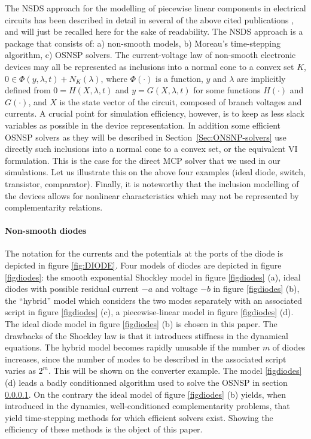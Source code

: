 The NSDS approach for the  modelling of piecewise linear components in electrical circuits has been described in detail  in several of the above cited publications \cite{acary-brogliato2008,glocker2005,moreau1988,jean1999,moreau1999}, and will just be recalled here for the sake of readability. The NSDS approach is a package that consists of: a) non-smooth models, b) Moreau's time-stepping algorithm, c) OSNSP solvers. The current-voltage law of non-smooth electronic devices  may all be represented as inclusions into a normal cone to a convex set $K$, $0 \in \Phi(y,\lambda,t) + N_{K}(\lambda)$, where $\Phi(\cdot)$ is a function, $y$ and $\lambda$ are implicitly defined from $0=H(X,\lambda,t)$ and $y=G(X,\lambda,t)$ for some functions $H(\cdot)$ and $G(\cdot)$, and $X$ is the state vector of the circuit, composed of branch voltages and currents. A crucial point for simulation efficiency, however, is to keep as less slack variables as possible in the device representation. In addition some efficient OSNSP solvers as they will be described in Section~\ref{Sec:ONSNP-solvers} use directly such inclusions into a normal cone to a convex set, or the equivalent VI formulation. This is the case for the direct MCP solver that we used in our simulations. Let us illustrate this on the above four examples (ideal diode, switch, transistor, comparator). Finally, it is noteworthy that the inclusion modelling of the devices allows for nonlinear characteristics which may not be represented by complementarity relations. 



\paragraph{Non-smooth  diodes}  The notation for the currents and the potentials at the ports of
the diode is depicted in figure \ref{fig:DIODE}. Four models of diodes are depicted in figure \ref{figdiodes}: the smooth exponential Shockley model in figure \ref{figdiodes} (a), ideal diodes with possible residual current $-a$ and voltage $-b$ in figure \ref{figdiodes} (b), the ``hybrid'' model which considers the two modes separately with an associated script in figure \ref{figdiodes} (c), a piecewise-linear model in figure \ref{figdiodes} (d). The ideal diode model in figure  \ref{figdiodes} (b) is chosen in this paper. The drawbacks of the Shockley law is that it introduces stiffness in the dynamical equations. The hybrid model becomes rapidly unusable if the number $m$ of diodes increases, since the number of modes to be described in the associated script varies as $2^{m}$. This will be shown on the converter example. The model \ref{figdiodes} (d) leads a badly conditionned  algorithm  used to solve the OSNSP in section \ref{}. On the contrary the ideal model of figure  \ref{figdiodes} (b) yields, when introduced in the dynamics, well-conditioned complementarity problems, that yield time-stepping methods for which efficient solvers exist. Showing the efficiency of these methods is the object of this paper.


